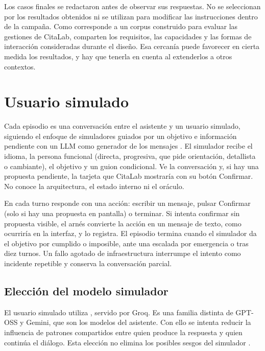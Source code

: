 Los casos finales se redactaron antes de observar sus respuestas. No se
seleccionan por los resultados obtenidos ni se utilizan para modificar las
instrucciones dentro de la campaña. Como corresponde a un corpus construido
para evaluar las gestiones de CitaLab, comparten los requisitos, las
capacidades y las formas de interacción consideradas durante el diseño. Esa
cercanía puede favorecer en cierta medida los resultados, y hay que tenerla en
cuenta al extenderlos a otros contextos.

\section{Usuario simulado}
\label{sec:metodo-simulador}

Cada episodio es una conversación entre el asistente y un usuario simulado,
siguiendo el enfoque de simuladores guiados por un objetivo e información
pendiente \citep{schatzmann2007agenda} con un LLM como generador de los
mensajes \citep{ni2026simulation,mehri2026goalalignment}. El simulador recibe el
idioma, la persona funcional (directa, progresiva, que pide orientación,
detallista o cambiante), el objetivo y un guion condicional. Ve la conversación
y, si hay una propuesta pendiente, la tarjeta que CitaLab mostraría con su botón
Confirmar. No conoce la arquitectura, el estado interno ni el oráculo.

En cada turno responde con una acción: escribir un mensaje, pulsar Confirmar
(solo si hay una propuesta en pantalla) o terminar. Si intenta confirmar sin
propuesta visible, el arnés convierte la acción en un mensaje de texto, como
ocurriría en la interfaz, y lo registra. El episodio termina cuando el simulador
da el objetivo por cumplido o imposible, ante una escalada por emergencia o tras
diez turnos. Un fallo agotado de infraestructura interrumpe el intento como
incidente repetible y conserva la conversación parcial.

\subsection{Elección del modelo simulador}

El usuario simulado utiliza , servido por Groq. Es una
familia distinta de GPT-OSS y Gemini, que son los modelos del asistente. Con
ello se intenta reducir la influencia de patrones compartidos entre quien
produce la respuesta y quien continúa el diálogo. Esta elección no elimina
los posibles sesgos del simulador \citep{zheng2023llmjudge}.

